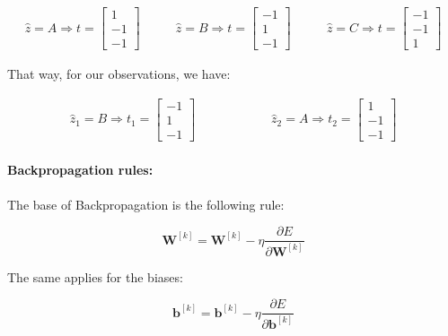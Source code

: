 \documentclass[12pt]{article}
\begin{document}
\begin{enumerate}[leftmargin=\labelsep]
    \begin{equation}
    \begin{aligned}
        \hat{z} = A \Rightarrow t = \begin{bmatrix}
            1 \\ -1 \\ -1
        \end{bmatrix} &\qquad \hat{z} = B \Rightarrow t = \begin{bmatrix}
            -1 \\ 1 \\ -1
        \end{bmatrix} &\qquad \hat{z} = C \Rightarrow t = \begin{bmatrix}
            -1 \\ -1 \\ 1
        \end{bmatrix}
    \end{aligned}
    \end{equation}

    That way, for our observations, we have:

    \begin{equation}
    \begin{aligned}
        \hat{z}_1 = B \Rightarrow t_1 = \begin{bmatrix}
            -1 \\ 1 \\ -1
        \end{bmatrix} \qquad\qquad\qquad \hat{z}_2 = A \Rightarrow t_2 = \begin{bmatrix}
            1 \\ -1 \\ -1
        \end{bmatrix}
    \end{aligned}
    \end{equation}

    \paragraph{Backpropagation rules:} The base of Backpropagation is the following rule:

    \begin{equation}
        \mathbf{W}^{[k]} = \mathbf{W}^{[k]} - \eta\frac{\partial E}{\partial \mathbf{W}^{[k]}}
    \end{equation}

    The same applies for the biases:

    \begin{equation}
        \mathbf{b}^{[k]} = \mathbf{b}^{[k]} - \eta\frac{\partial E}{\partial \mathbf{b}^{[k]}}
    \end{equation}


\end{enumerate}
\end{document}
